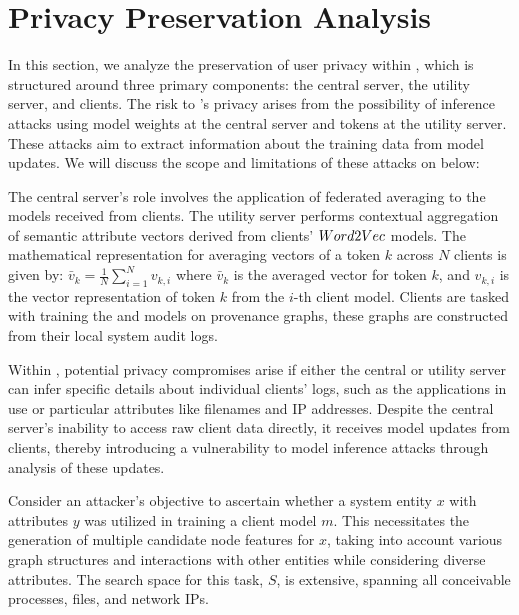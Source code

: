 \section{Privacy Preservation Analysis}
\label{sec:privacy}



In this section, we analyze the preservation of user privacy within \Sys, which is structured around three primary components: the central server, the utility server, and clients. The risk to \Sys's privacy arises from the possibility of inference attacks using model weights at the central server and \wordvec tokens at the utility server. These attacks aim to extract information about the training data from model updates. We will discuss the scope and limitations of these attacks on \Sys below:

 The central server's role involves the application of federated averaging to the \gnnshort models received from clients. The utility server performs contextual aggregation of semantic attribute vectors derived from clients' \(Word2Vec\) models.  The mathematical representation for averaging vectors of a token \(k\) across \(N\) clients is given by: \( \bar{v}_k = \frac{1}{N} \sum_{i=1}^{N} v_{k,i} \) where \(\bar{v}_k\) is the averaged vector for token \(k\), and \(v_{k,i}\) is the vector representation of token \(k\) from the \(i\)-th client model. Clients are tasked with training the \wordvec and \gnnshort models on provenance graphs, these graphs are constructed from their local system audit logs.

 Within \Sys, potential privacy compromises arise if either the central or utility server can infer specific details about individual clients' logs, such as the applications in use or particular attributes like filenames and IP addresses. Despite the central server's inability to access raw client data directly, it receives model updates from clients, thereby introducing a vulnerability to model inference attacks through analysis of these updates.

Consider an attacker's objective to ascertain whether a system entity \(x\) with attributes \(y\) was utilized in training a client model \(m\). This necessitates the generation of multiple candidate node features for \(x\), taking into account various graph structures and interactions with other entities while considering diverse attributes. The search space for this task, \(S\), is extensive, spanning all conceivable processes, files, and network IPs.

